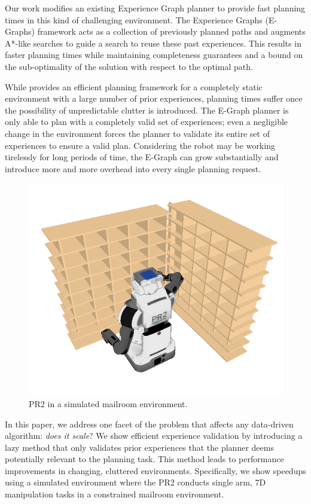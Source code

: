 \documentclass[letterpaper, 10 pt, conference]{ieeeconf}  %
\newcommand{\figlab}[1]{\label{fig:#1}}
\begin{document}
Our work modifies an existing Experience Graph planner \cite{PhillipsRSS:2012} to provide
fast planning times in this kind of challenging environment. The Experience
Graphs (E-Graphs) framework acts as a collection of previously planned
paths and augments A*-like searches to guide a search to reuse these past
experiences. This results in faster planning times while maintaining
completeness guarantees and a bound on the sub-optimality of the solution with
respect to the optimal path.

While \cite{PhillipsRSS:2012} provides an efficient planning framework for a completely
static environment with a large number of prior experiences, planning times
suffer once the possibility of unpredictable clutter is introduced. The
E-Graph planner is only able to plan with a completely valid set of experiences;
even a negligible change in the environment forces the planner to validate its
entire set of experiences to ensure a valid plan. Considering the robot may be
working tirelessly for long periods of time, the E-Graph can grow substantially
and introduce more and more overhead into every single planning request.  

\begin{figure}
    \centering
    \includegraphics[scale=.3]{basic_env.png}
    \caption{PR2 in a simulated mailroom environment.}
    \figlab{mailroom}
\end{figure}

In this paper, we address one facet of the problem that affects any data-driven
algorithm: \emph{does it scale}? We show efficient experience validation by
introducing a lazy method that only validates prior experiences that the planner
deems potentially relevant to the planning task. This method leads to
performance improvements in changing, cluttered environments. Specifically, we
show speedups using a simulated environment where the PR2 conducts single arm,
7D manipulation tasks in a constrained mailroom environment.
\end{document}
